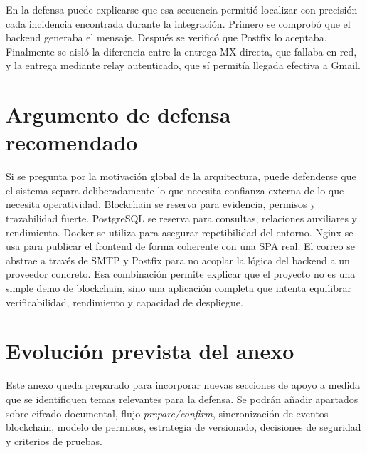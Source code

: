 \documentclass[11pt, a4paper]{article}
\begin{document}
En la defensa puede explicarse que esa secuencia permitió localizar con precisión cada incidencia encontrada durante la integración. Primero se comprobó que el backend generaba el mensaje. Después se verificó que Postfix lo aceptaba. Finalmente se aisló la diferencia entre la entrega MX directa, que fallaba en red, y la entrega mediante relay autenticado, que sí permitía llegada efectiva a Gmail.

\section{Argumento de defensa recomendado}

Si se pregunta por la motivación global de la arquitectura, puede defenderse que el sistema separa deliberadamente lo que necesita confianza externa de lo que necesita operatividad. Blockchain se reserva para evidencia, permisos y trazabilidad fuerte. PostgreSQL se reserva para consultas, relaciones auxiliares y rendimiento. Docker se utiliza para asegurar repetibilidad del entorno. Nginx se usa para publicar el frontend de forma coherente con una SPA real. El correo se abstrae a través de SMTP y Postfix para no acoplar la lógica del backend a un proveedor concreto. Esa combinación permite explicar que el proyecto no es una simple demo de blockchain, sino una aplicación completa que intenta equilibrar verificabilidad, rendimiento y capacidad de despliegue.

\section{Evolución prevista del anexo}

Este anexo queda preparado para incorporar nuevas secciones de apoyo a medida que se identifiquen temas relevantes para la defensa. Se podrán añadir apartados sobre cifrado documental, flujo \textit{prepare/confirm}, sincronización de eventos blockchain, modelo de permisos, estrategia de versionado, decisiones de seguridad y criterios de pruebas.
\end{document}
